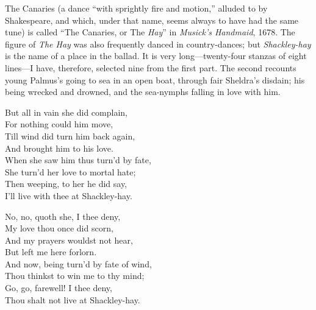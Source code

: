\pagebreak%

The Canaries (a dance “with sprightly fire and motion,” alluded to by
Shakespeare, and which, under that name, seems always to have had the same
tune) is called “The Canaries, or The \textit{Hay}” in \textit{Musick's Handmaid}, 1678.
The figure of \textit{The Hay} was also frequently danced in country-dances; but
\textit{Shackley-hay} is the name of a place in the ballad. It is very long—twenty-four
stanzas of eight lines—I have, therefore, selected nine from the first part. The
second recounts young Palmus’s going to sea in an open boat, through fair
Sheldra’s disdain; his being wrecked and drowned, and the sea-nymphs falling in
love with him.



\settowidth{\versewidth}{But all in vain she did complain,}
\begin{dcverse}\begin{patverse}
But all in vain she did complain,\\
For nothing could him move,\\
Till wind did turn him back again,\\
And brought him to his love.\\
When she saw him thus turn’d by fate,\\
She turn’d her love to mortal hate;\\
Then weeping, to her he did say,\\
I’ll live with thee at Shackley-hay.
\end{patverse}

\begin{patverse}
No, no, quoth she, I thee deny,\\
My love thou once did scorn,\\
And my prayers wouldst not hear,\\
But left me here forlorn.\\
And now, being turn’d by fate of wind,\\
Thou thinkst to win me to thy mind;\\
Go, go, farewell! I thee deny,\\
Thou shalt not live at Shackley-hay.
\end{patverse}
\end{dcverse}
\pagebreak%

